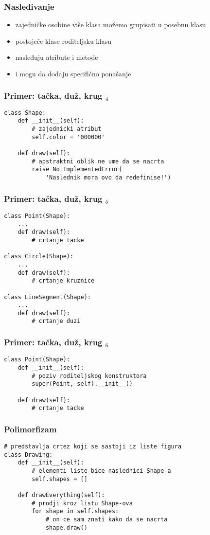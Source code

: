 \documentclass[utf8,compress,aspectratio=169]{beamer}
\begin{document}
\begin{frame}[fragile]
  \frametitle{Nasleđivanje}
  \begin{itemize}
    \item zajedničke osobine više klasa možemo grupisati u posebnu  klasu
    \item postojeće klase  roditeljsku klasu
    \item nasleđuju atribute i metode
    \item i mogu da dodaju specifično ponašanje
  \end{itemize}
\end{frame}

\begin{frame}[fragile]
  \frametitle{Primer: tačka, duž, krug $_4$}
\begin{verbatim}
class Shape:
    def __init__(self):
        # zajednicki atribut
        self.color = '000000'

    def draw(self):
        # apstraktni oblik ne ume da se nacrta
        raise NotImplementedError(
            'Naslednik mora ovo da redefinise!')
\end{verbatim}
\end{frame}

\begin{frame}
  \frametitle{Primer: tačka, duž, krug $_5$}
\begin{verbatim}
class Point(Shape):
    ...
    def draw(self):
        # crtanje tacke

class Circle(Shape):
    ...
    def draw(self):
        # crtanje kruznice

class LineSegment(Shape):
    ...
    def draw(self):
        # crtanje duzi
\end{verbatim}
\end{frame}

\begin{frame}
  \frametitle{Primer: tačka, duž, krug $_6$}
\begin{verbatim}
class Point(Shape):
    def __init__(self):
        # poziv roditeljskog konstruktora
        super(Point, self).__init__()

    def draw(self):
        # crtanje tacke
\end{verbatim}
\end{frame}

\begin{frame}[fragile]
  \frametitle{Polimorfizam}
\begin{verbatim}
# predstavlja crtez koji se sastoji iz liste figura
class Drawing:
    def __init__(self):
        # elementi liste bice naslednici Shape-a
        self.shapes = []

    def drawEverything(self):
        # prodji kroz listu Shape-ova
        for shape in self.shapes:
            # on ce sam znati kako da se nacrta
            shape.draw()
\end{verbatim}
\end{frame}
\end{document}
